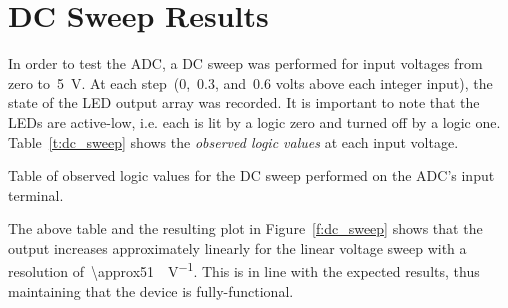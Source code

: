 \section{DC Sweep Results}
In order to test the ADC, a DC sweep was performed for input voltages from zero
to~\SI{5}{\volt}.  At each step~(0,~0.3, and~0.6 volts above each integer
input), the state of the LED output array was recorded.  It is important to
note that the LEDs are active-low, i.e. each is lit by a logic zero and turned
off by a logic one.  Table~\ref{t:dc_sweep} shows the \emph{observed logic
values} at each input voltage.
%
\begin{table}[H]
\centering
	
	\parbox{.6\textwidth}{
	\caption[DC sweep results]{Table of observed logic values for the DC sweep
	performed on the ADC's input terminal.}
	\label{t:dc_sweep}}
\end{table}
%
The above table and the resulting plot in Figure~\ref{f:dc_sweep} shows that
the output increases approximately linearly for the linear voltage sweep with a
resolution of~\SI{\approx51}{\bit\per\volt}.  This is in line with the expected
results, thus maintaining that the device is fully-functional.
